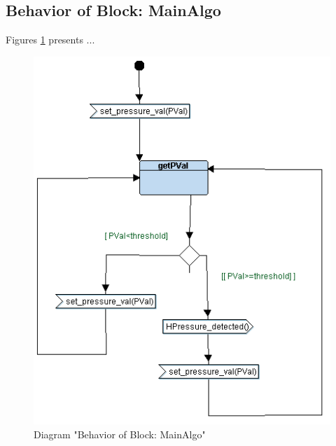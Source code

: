 \subsection{Behavior of Block: MainAlgo}
Figures \ref{fig:MainAlgoMainAlgo22} presents ...
\begin{figure}[htb]
\centering
\includegraphics[width=\textwidth]{img_2_2.png}
\caption{Diagram "Behavior of Block: MainAlgo"}
\label{fig:MainAlgoMainAlgo22}
\end{figure}

